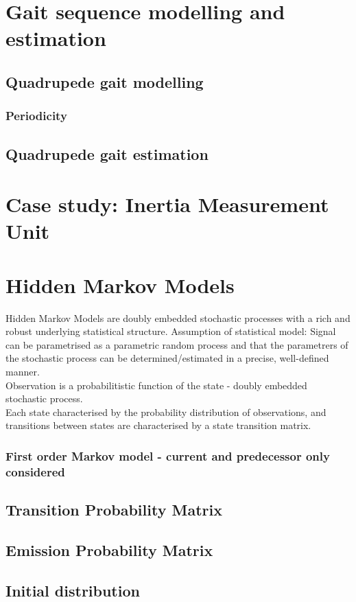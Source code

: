 \section{Gait sequence modelling and estimation}
\subsection{Quadrupede gait modelling}
\subsubsection{Periodicity}
\subsection{Quadrupede gait estimation}
\section{Case study: Inertia Measurement Unit}
\section{Hidden Markov Models}
Hidden Markov Models are doubly embedded stochastic processes with a rich and robust underlying statistical structure.
Assumption of statistical model: Signal can be parametrised as a parametric random process and that the parametrers of the stochastic process can be determined/estimated in a precise, well-defined manner.\\
Observation is a probabilitistic function of the state - doubly embedded stochastic process.\\
Each state characterised by the probability distribution of observations, and transitions between states are characterised by a state transition matrix.
\subsubsection{First order Markov model - current and predecessor only considered}
\subsection{Transition Probability Matrix}
\subsection{Emission Probability Matrix}
\subsection{Initial distribution}
